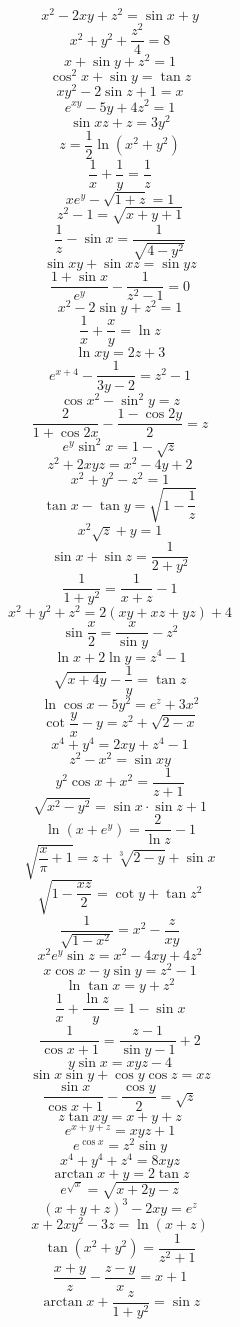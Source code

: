 \[ x^2 - 2xy + z^2 = \sin{x} + y \]
\[ x^2 + y^2 + \frac{z^2}{4} = 8 \]
\[ x + \sin{y} + z^2 = 1 \]
\[ \cos^2{x} + \sin{y} = \tan{z} \]
\[ xy^2 - 2\sin{z} + 1 = x \]
\[ e^{xy} - 5y + 4z^2 = 1 \]
\[ \sin{xz} + z = 3y^2 \]
\[ z = \frac{1}{2} \ln{(x^2+y^2)} \]
\[ \frac{1}{x} + \frac{1}{y} = \frac{1}{z} \]
\[ xe^y - \sqrt{1+z} = 1 \]
\[ z^2 - 1 = \sqrt{x+y+1} \]
\[ \frac{1}{z} - \sin{x} = \frac{1}{\sqrt{4-y^2}} \]
\[ \sin{xy} + \sin{xz} = \sin{yz} \]
\[ \frac{1 + \sin{x}}{e^y} - \frac{1}{z^2 - 1} = 0 \]
\[ x^2 - 2\sin{y} + z^2 = 1 \]
\[ \frac{1}{x} + \frac{x}{y} = \ln{z} \]
\[ \ln{xy} = 2z + 3 \]
\[ e^{x + 4} - \frac{1}{3y-2} = z^2 - 1 \]
\[ \cos{x^2} - \sin^2{y} = z \]
\[ \frac{2}{1 + \cos{2x}} - \frac{1 - \cos{2y}}{2} = z \]
\[ e^y \sin^2{x} = 1 - \sqrt{z} \]
\[ z^2 + 2xyz = x^2 - 4y + 2 \]
\[ x^2 + y^2 - z^2 = 1 \]
\[ \tan{x} - \tan{y} = \sqrt{1 - \frac{1}{z}} \]
\[ x^2 \sqrt{z} + y = 1 \]
\[ \sin{x} + \sin{z} = \frac{1}{2 + y^2} \]
\[ \frac{1}{1+y^2} = \frac{1}{x+z} - 1 \]
\[ x^2 + y^2 + z^2 = 2(xy + xz + yz) + 4 \]
\[ \sin{\frac{x}{2}} = \frac{x}{\sin{y}} - z^2 \]
\[ \ln{x} + 2\ln{y} = z^4 - 1 \]
\[ \sqrt{x+4y} - \frac{1}{y} = \tan{z} \]
\[ \ln{\cos{x}} - 5y^2 = e^z + 3x^2 \]
\[ \cot{\frac{y}{x}} - y = z^2 + \sqrt{2 - x} \]
\[ x^4 + y^4 = 2xy + z^4 - 1 \]
\[ z^2 - x^2 = \sin{xy} \]
\[ y^2 \cos{x} + x^2 = \frac{1}{z+1} \]
\[ \sqrt{x^2 - y^2} = \sin{x} \cdot \sin{z} + 1 \]
\[ \ln\left( x + e^{y} \right) = \frac{2}{\ln{z}} - 1 \]
\[ \sqrt{\frac{x}{\pi} + 1} = z + \sqrt[3]{2 - y} + \sin{x} \]
\[ \sqrt{1 - \frac{xz}{2}} = \cot{y} + \tan{z^2} \]
\[ \frac{1}{\sqrt{1 - x^2}} = x^2 - \frac{z}{xy} \]
\[ x^2 e^y \sin{z} = x^2 - 4xy + 4z^2 \]
\[ x \cos{x} - y \sin{y} = z^2 - 1 \]
\[ \ln{\tan{x}} = y + z^2 \]
\[ \frac{1}{x} + \frac{\ln{z}}{y} = 1 - \sin{x} \]
\[ \frac{1}{\cos{x} + 1} = \frac{z - 1}{\sin{y} - 1} + 2 \]
\[ y\sin{x} = xyz - 4 \]
\[ \sin{x}\sin{y} + \cos{y}\cos{z} = xz \]
\[ \frac{\sin{x}}{\cos{x} + 1} - \frac{\cos{y}}{2} = \sqrt{z} \]
\[ z\tan{xy} = x + y + z \]
\[ e^{x+y+z} = xyz + 1 \]
\[ e^{\cos{x}} = z^2\sin{y} \]
\[ x^4 + y^4 + z^4 = 8xyz \]
\[ \arctan{x} + y = 2\tan{z} \]
\[ e^{\sqrt{x}} = \sqrt{x + 2y - z} \]
\[ (x + y + z)^3 - 2xy = e^z \]
\[ x + 2xy^2 - 3z = \ln(x+z) \]
\[ \tan\left( x^2 + y^2 \right) = \frac{1}{z^2+1} \]
\[ \frac{x+y}{z} - \frac{z-y}{x} = x+1 \]
\[ \arctan{x} + \frac{z}{1+y^2} = \sin{z} \]